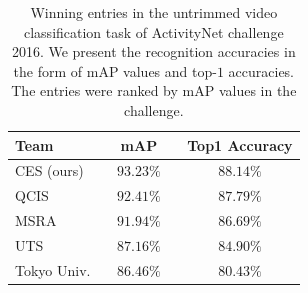 \documentclass[10pt,journal,compsoc]{IEEEtran}
\begin{document}
\begin{table}[h!]
  \begin{center}
    \caption{Winning entries in the untrimmed video classification task of ActivityNet challenge 2016. We present the recognition accuracies in the form of mAP values and top-$ 1 $ accuracies. The entries were ranked by mAP values in the challenge. }
    \label{tbl:anet_challenge}
    \vspace{-10pt}
    \begin{tabular}{|l|c|c|}
      \hline
      Team & ~~mAP~~ & Top1 Accuracy \\
      \hline
      \hline 
      CES (ours) & $ \mathbf{93.23}\% $ & $ \mathbf{88.14}\% $\\
      QCIS &  $ 92.41\% $ & $ 87.79\% $\\
      MSRA & $ 91.94\% $ & $ 86.69\% $ \\
      UTS & $ 87.16\% $ & $ 84.90\% $ \\
      Tokyo Univ. & $86.46\%$ & $80.43\%$ \\ 
      \hline
    \end{tabular}
  \end{center}
  \vspace{-20pt}
\end{table}
\end{document}
